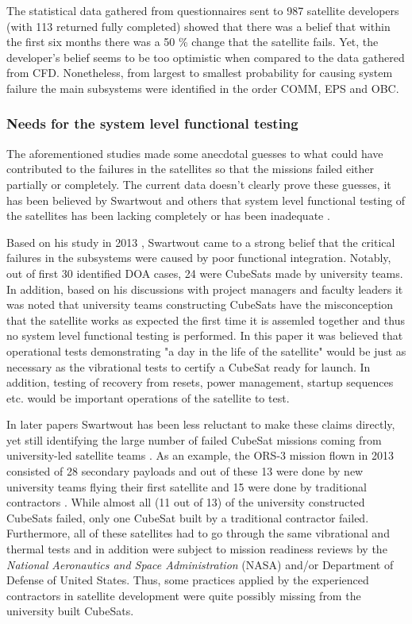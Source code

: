 \documentclass[english,12pt,a4paper,pdftex,elec,utf8]{aaltothesis}
\begin{document}
The statistical data gathered from questionnaires sent to 987 satellite developers (with 113 returned fully completed) showed that there was a belief that within the first six months there was a 50 \% change that the satellite fails. Yet, the developer's belief seems to be too optimistic when compared to the data gathered from CFD. Nonetheless, from largest to smallest probability for causing system failure the main subsystems were identified in the order COMM, EPS and OBC.\cite{Langer}\par
\subsubsection{Needs for the system level functional testing}
The aforementioned studies made some anecdotal guesses to what could have contributed to the failures in the satellites so that the missions failed either partially or completely. The current data doesn't clearly prove these guesses, it has been believed by Swartwout and others that system level functional testing of the satellites has been lacking completely or has been inadequate \cite{Swart1, Swart2016, Swart2015, Langer}. \par
Based on his study in 2013 \cite{Swart1}, Swartwout came to a strong belief that the critical failures in the subsystems were caused by poor functional integration. Notably, out of first 30 identified DOA cases, 24 were CubeSats made by university teams. In addition, based on his discussions with project managers and faculty leaders it was noted that university teams constructing CubeSats have the misconception that the satellite works as expected the first time it is assemled together and thus no system level functional testing is performed. In this paper it was believed that operational tests demonstrating "a day in the life of the satellite" would be just as necessary as the vibrational tests to certify a CubeSat ready for launch. In addition, testing of recovery from resets, power management, startup sequences etc. would be important operations of the satellite to test. \cite{Swart1} \par
In later papers Swartwout has been less reluctant to make these claims directly, yet still identifying the large number of failed CubeSat missions coming from university-led satellite teams \cite{Swart2016, Swart2015}. As an example, the ORS-3 mission flown in 2013 consisted of 28 secondary payloads and out of these 13 were done by new university teams flying their first satellite and 15 were done by traditional contractors \cite{Swart2016}. While almost all (11 out of 13) of the university constructed CubeSats failed, only one CubeSat built by a traditional contractor failed. Furthermore, all of these satellites had to go through the same vibrational and thermal tests and in addition were subject to mission readiness reviews by the \textit{National Aeronautics and Space Administration} (NASA) and/or Department of Defense of United States. Thus, some practices applied by the experienced contractors in satellite development were quite possibly missing from the university built CubeSats.\par
\end{document}
